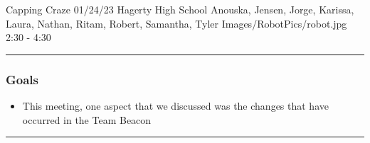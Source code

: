 \insertmeeting 
	{Capping Craze} 
	{01/24/23} 
	{Hagerty High School}
	{Anouska, Jensen, Jorge, Karissa, Laura, Nathan, Ritam, Robert, Samantha, Tyler}
	{Images/RobotPics/robot.jpg}
	{2:30 - 4:30}
	
\noindent\hfil\rule{\textwidth}{.4pt}\hfil
\subsubsection*{Goals}
\begin{itemize}
    \item This meeting, one aspect that we discussed was the changes that have occurred in the Team Beacon 

\end{itemize} 

\noindent\hfil\rule{\textwidth}{.4pt}\hfil

